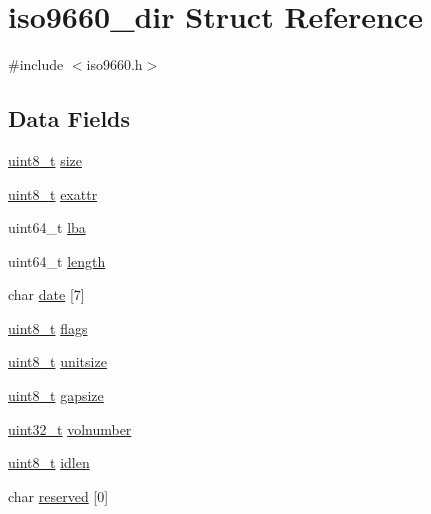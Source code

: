 \hypertarget{structiso9660__dir}{\section{iso9660\+\_\+dir Struct Reference}
\label{structiso9660__dir}
}


{\ttfamily \#include $<$iso9660.\+h$>$}

\subsection*{Data Fields}
\begin{DoxyCompactItemize}
\item 
\hyperlink{aplus_8h_ae0430369c5a35dcdbc0bc19dcbb33a03}{uint8\+\_\+t} \hyperlink{structiso9660__dir_a73204b6ab2ae137b1f77476e6c1448da}{size}
\item 
\hyperlink{aplus_8h_ae0430369c5a35dcdbc0bc19dcbb33a03}{uint8\+\_\+t} \hyperlink{structiso9660__dir_a9d379f70dbe8ddf0ad21cbb4d9269f4a}{exattr}
\item 
uint64\+\_\+t \hyperlink{structiso9660__dir_aa953c10b14a6fcaf2d71a067df031def}{lba}
\item 
uint64\+\_\+t \hyperlink{structiso9660__dir_a8c14ed10aeaa7fa626b5d03b3902e083}{length}
\item 
char \hyperlink{structiso9660__dir_ad1a0e3827108b5d4583e46056c98f302}{date} \mbox{[}7\mbox{]}
\item 
\hyperlink{aplus_8h_ae0430369c5a35dcdbc0bc19dcbb33a03}{uint8\+\_\+t} \hyperlink{structiso9660__dir_ab226f852b18e2b9dcddf013e3da07742}{flags}
\item 
\hyperlink{aplus_8h_ae0430369c5a35dcdbc0bc19dcbb33a03}{uint8\+\_\+t} \hyperlink{structiso9660__dir_a526e37b4f96c65db4c2ab5853155ee31}{unitsize}
\item 
\hyperlink{aplus_8h_ae0430369c5a35dcdbc0bc19dcbb33a03}{uint8\+\_\+t} \hyperlink{structiso9660__dir_a358fa7ee0501266c9006e7b037027ee6}{gapsize}
\item 
\hyperlink{aplus_8h_a53a0df51603c77c2aa5b9ea61b606a82}{uint32\+\_\+t} \hyperlink{structiso9660__dir_afa69b98db7042e4e30ae0a08f3d6f12d}{volnumber}
\item 
\hyperlink{aplus_8h_ae0430369c5a35dcdbc0bc19dcbb33a03}{uint8\+\_\+t} \hyperlink{structiso9660__dir_a6b591363e79296cc8b68df9b481e1ff8}{idlen}
\item 
char \hyperlink{structiso9660__dir_a6350cc135fe835f4372fcf9a0cfe0fcc}{reserved} \mbox{[}0\mbox{]}
\end{DoxyCompactItemize}


